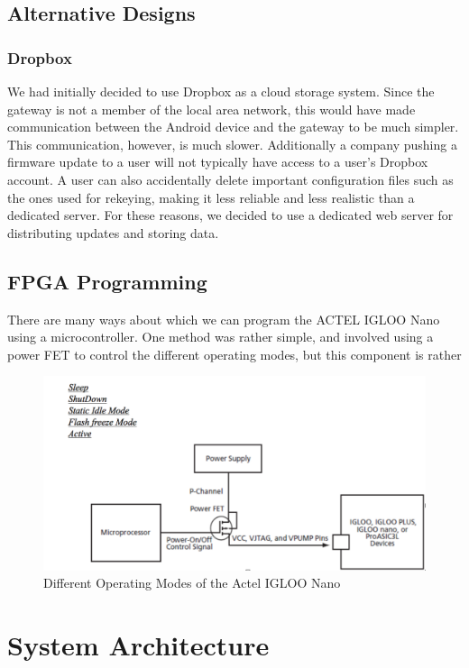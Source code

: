 \documentclass[11pt]{article}
\begin{document}
\FloatBarrier


\subsection{Alternative Designs}

\subsubsection{Dropbox}
We had initially decided to use Dropbox as a cloud storage system. Since the gateway is not a member of the local area network, this would have made communication between the Android device and the gateway to be much simpler. This communication, however, is much slower. Additionally a company pushing a firmware update to a user will not typically have access to a user's Dropbox account. A user can also accidentally delete important configuration files such as the ones used for rekeying, making it less reliable and less realistic than a dedicated server. For these reasons, we decided to use a dedicated web server for distributing updates and storing data. 

\subsection{FPGA Programming}
There are many ways about which we can program the ACTEL IGLOO Nano using a microcontroller. One method was rather simple, and involved using a power FET to control the different operating modes, but this component is rather 

\begin{figure}[!ht]
\centering
\includegraphics[scale = 0.35]{opmodes.png}
\caption{Different Operating Modes of the Actel IGLOO Nano}
\end{figure}

\section{System Architecture}
\end{document}
